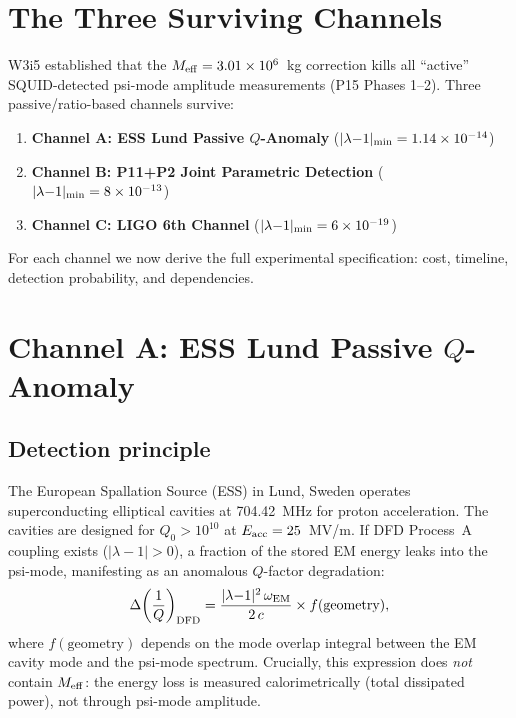 \documentclass[11pt]{article}
\newcommand{\ee}[1]{\times 10^{#1}}
\newcommand{\Meff}{M_{\rm eff}}
\newcommand{\lamdiff}{|\lambda{-}1|}
\begin{document}
\section{The Three Surviving Channels}
\label{sec:P15-channels}

W3i5 established that the $\Meff = 3.01\ee{6}$~kg correction kills all
``active'' SQUID-detected psi-mode amplitude measurements (P15 Phases 1--2).
Three passive/ratio-based channels survive:

\begin{enumerate}
\item \textbf{Channel A: ESS Lund Passive $Q$-Anomaly}
  ($\lamdiff_{\rm min} = 1.14\ee{-14}$)
\item \textbf{Channel B: P11+P2 Joint Parametric Detection}
  ($\lamdiff_{\rm min} = 8\ee{-13}$)
\item \textbf{Channel C: LIGO 6th Channel}
  ($\lamdiff_{\rm min} = 6\ee{-19}$)
\end{enumerate}

For each channel we now derive the full experimental specification:
cost, timeline, detection probability, and dependencies.

\section{Channel A: ESS Lund Passive $Q$-Anomaly}
\label{sec:channel-A}

\subsection{Detection principle}

The European Spallation Source (ESS) in Lund, Sweden operates
superconducting elliptical cavities at 704.42~MHz for proton
acceleration. The cavities are designed for $Q_0 > 10^{10}$ at
$E_{\rm acc} = 25$~MV/m. If DFD Process~A coupling exists
($\lamdiff > 0$), a fraction of the stored EM energy leaks into the
psi-mode, manifesting as an anomalous $Q$-factor degradation:
\begin{equation}
\Delta\!\left(\frac{1}{Q}\right)_{\rm DFD}
= \frac{\lamdiff^2\,\omega_{\rm EM}}{2\,c}
\times f(\text{geometry}),
\label{eq:Q-anomaly}
\end{equation}
where $f(\text{geometry})$ depends on the mode overlap integral between
the EM cavity mode and the psi-mode spectrum. Crucially, this
expression does \emph{not} contain $\Meff$: the energy loss is measured
calorimetrically (total dissipated power), not through psi-mode amplitude.
\end{document}
